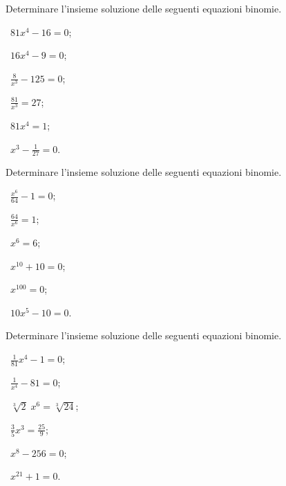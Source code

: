 \begin{esercizio}[\Ast]
 \label{ese:5.16}
Determinare l'insieme soluzione delle seguenti equazioni binomie.
\begin{multicols}{3}
 \begin{enumeratea}
 \item~$81x^4-16=0$;
 \item~$16x^4-9=0$;
 \item~$\frac 8{x^3}-125=0$;
 \item~$\frac{81}{x^3}=27$;
 \item~$81x^4=1$;
 \item~$x^3-\frac 1{27}=0$.
 \end{enumeratea}
 \end{multicols}
\end{esercizio}

\begin{esercizio}
 \label{ese:5.17}
Determinare l'insieme soluzione delle seguenti equazioni binomie.
\begin{multicols}{3}
 \begin{enumeratea}
 \item~$\frac{x^6}{64}-1=0$;
 \item~$\frac{64}{x^6}=1$;
 \item~$x^6=6$;
 \item~$x^{10}+10=0$;
 \item~$x^{100}=0$;
 \item~$10x^5-10=0$.
 \end{enumeratea}
 \end{multicols}
\end{esercizio}

\begin{esercizio}[\Ast]
 \label{ese:5.18}
Determinare l'insieme soluzione delle seguenti equazioni binomie.
\begin{multicols}{3}
 \begin{enumeratea}
 \item~$\frac 1{81}x^4-1=0$;
 \item~$\frac 1{x^4}-81=0$;
 \item~$\sqrt[3]2\;x^6=\sqrt[3]{24}$;
 \item~$\frac 3 5x^3=\frac{25} 9$;
 \item~$x^8-256=0$;
 \item~$x^{21}+1=0$.
 \end{enumeratea}
 \end{multicols}
\end{esercizio}

